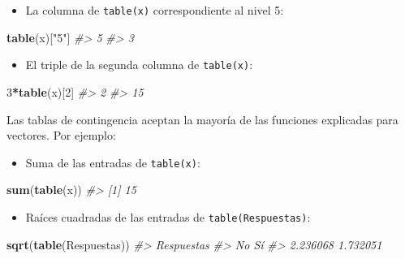 \documentclass[
]{book}
\newenvironment{Shaded}{\begin{snugshade}}{\end{snugshade}}
\newcommand{\CommentTok}[1]{\textcolor[rgb]{0.56,0.35,0.01}{\textit{#1}}}
\newcommand{\DecValTok}[1]{\textcolor[rgb]{0.00,0.00,0.81}{#1}}
\newcommand{\KeywordTok}[1]{\textcolor[rgb]{0.13,0.29,0.53}{\textbf{#1}}}
\newcommand{\NormalTok}[1]{#1}
\newcommand{\OperatorTok}[1]{\textcolor[rgb]{0.81,0.36,0.00}{\textbf{#1}}}
\newcommand{\StringTok}[1]{\textcolor[rgb]{0.31,0.60,0.02}{#1}}
\providecommand{\tightlist}{%
  \setlength{\itemsep}{0pt}\setlength{\parskip}{0pt}}
\theoremstyle{definition}
\theoremstyle{definition}
\theoremstyle{definition}
\theoremstyle{remark}
\begin{document}
\begin{itemize}
\tightlist
\item
  La columna de \texttt{table(x)} correspondiente al nivel 5:
\end{itemize}

\begin{Shaded}
\begin{Highlighting}[]
\KeywordTok{table}\NormalTok{(x)[}\StringTok{"5"}\NormalTok{]}
\CommentTok{\#\textgreater{} 5 }
\CommentTok{\#\textgreater{} 3}
\end{Highlighting}
\end{Shaded}

\begin{itemize}
\tightlist
\item
  El triple de la segunda columna de \texttt{table(x)}:
\end{itemize}

\begin{Shaded}
\begin{Highlighting}[]
\DecValTok{3}\OperatorTok{*}\KeywordTok{table}\NormalTok{(x)[}\DecValTok{2}\NormalTok{]}
\CommentTok{\#\textgreater{}  2 }
\CommentTok{\#\textgreater{} 15}
\end{Highlighting}
\end{Shaded}

Las tablas de contingencia aceptan la mayoría de las funciones explicadas para vectores. Por ejemplo:

\begin{itemize}
\tightlist
\item
  Suma de las entradas de \texttt{table(x)}:
\end{itemize}

\begin{Shaded}
\begin{Highlighting}[]
\KeywordTok{sum}\NormalTok{(}\KeywordTok{table}\NormalTok{(x))}
\CommentTok{\#\textgreater{} [1] 15}
\end{Highlighting}
\end{Shaded}

\begin{itemize}
\tightlist
\item
  Raíces cuadradas de las entradas de \texttt{table(Respuestas)}:
\end{itemize}

\begin{Shaded}
\begin{Highlighting}[]
\KeywordTok{sqrt}\NormalTok{(}\KeywordTok{table}\NormalTok{(Respuestas))}
\CommentTok{\#\textgreater{} Respuestas}
\CommentTok{\#\textgreater{}       No       Sí }
\CommentTok{\#\textgreater{} 2.236068 1.732051}
\end{Highlighting}
\end{Shaded}
\end{document}
